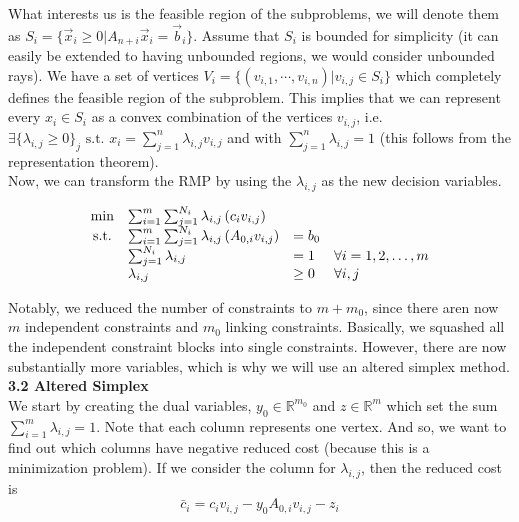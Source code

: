 \documentclass[11pt]{article}
\begin{document}
\noindent What interests us is the feasible region of the subproblems, we will denote them as $S_i = \{\vec{x}_i \geq 0 | A_{n+i} \vec{x}_i = \vec{b}_i\}$. Assume that $S_i$ is bounded for simplicity (it can easily be extended to having unbounded regions, we would consider unbounded rays). We have a set of vertices $V_i = \{(v_{i,1}, \cdots, v_{i,n}) | v_{i,j} \in S_i\}$ which completely defines the feasible region of the subproblem. This implies that we can represent every $x_i \in S_i$ as a convex combination of the vertices $v_{i,j}$, i.e. $\exists \{\lambda_{i,j} \geq 0\}_j \text{ s.t. } x_i = \sum_{j=1}^{n} \lambda_{i,j} v_{i,j}$ and with $\sum_{j=1}^{n} \lambda_{i,j} = 1$ (this follows from the representation theorem).
\\

\noindent Now, we can transform the RMP by using the $\lambda_{i,j}$ as the new decision variables.

$$
\begin{array}{clll}
    \min & \sum_{i=1}^m \sum_{j=1}^{N_i} \lambda_{i, j}\left(c_i v_{i, j}\right) & & \\
    \mathrm{s.t.} & \sum_{i=1}^m \sum_{j=1}^{N_i} \lambda_{i, j}\left(A_{0, i} v_{i, j}\right) & =b_0 & \\
    & \sum_{j=1}^{N_i} \lambda_{i, j} & =1 & \forall i=1,2, \ldots, m \\
    & \lambda_{i, j} & \geq 0 & \forall i, j
\end{array}\\
$$

\noindent Notably, we reduced the number of constraints to $m + m_0$, since there aren now $m$ independent constraints and $m_0$ linking constraints. Basically, we squashed all the independent constraint blocks into single constraints. However, there are now substantially more variables, which is why we will use an altered simplex method.
\\

\noindent \textbf{3.2 Altered Simplex}
\\

\noindent We start by creating the dual variables, $y_0 \in \mathbb{R}^{m_0}$ and $z \in \mathbb{R}^{m}$ which set the sum $\sum_{i=1}^{m} \lambda_{i, j} =1$. Note that each column represents one vertex. And so, we want to find out which columns have negative reduced cost (because this is a minimization problem). If we consider the column for $\lambda_{i, j}$, then the reduced cost is 
$$ \bar{c}_i = c_i v_{i, j} - y_0 A_{0, i} v_{i, j} - z_i $$
\end{document}
